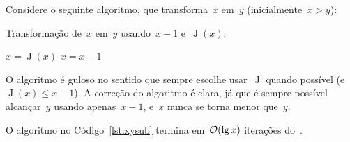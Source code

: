 \documentclass[main.tex]{subfiles}
\newcommand{\J}{\operatorname{J}}
\begin{document}
Considere o seguinte algoritmo, que transforma~$x$ em~$y$ (inicialmente~$x > y$):
\begin{algorithm}[h]
\caption{Transformação de~$x$ em~$y$ usando~$x-1$ e~$\J(x)$. \label{lst:xysub}}
\begin{algorithmic}[1]
		\If{$\J(x) \geq y$}
			\State $x = \J(x)$
		\Else
			\State $x = x - 1$
		\EndIf
	\EndWhile
\end{algorithmic}
\end{algorithm}

O algoritmo é guloso no sentido que sempre escolhe usar~$\J$ quando possível (e~${\J(x) \leq x - 1}$). A correção do algoritmo é clara, já que é sempre possível alcançar~$y$ usando apenas~$x-1$, e~$x$ nunca se torna menor que~$y$.

\begin{theorem} \label{thm:xysub}
	O algoritmo no Código~\ref{lst:xysub} termina em~$\mathcal{O}(\lg x)$ iterações do~.
\end{theorem}
\end{document}
